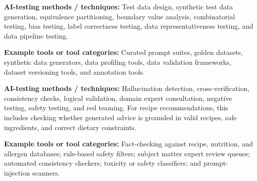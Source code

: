 \documentclass[
  letterpaper,
  DIV=11,
  numbers=noendperiod,
  oneside]{scrreprt}
\begin{document}
\begin{tcolorbox}[enhanced jigsaw, arc=.35mm, bottomrule=.15mm, bottomtitle=1mm, breakable, colback=white, colbacktitle=quarto-callout-tip-color!10!white, colframe=quarto-callout-tip-color-frame, coltitle=black, left=2mm, leftrule=.75mm, opacityback=0, opacitybacktitle=0.6, rightrule=.15mm, title=\textcolor{quarto-callout-tip-color}{\faLightbulb}\hspace{0.5em}{What test data do we use, and how is it managed?}, titlerule=0mm, toprule=.15mm, toptitle=1mm]

\textbf{AI-testing methods / techniques:} Test data design, synthetic
test data generation, equivalence partitioning, boundary value analysis,
combinatorial testing, bias testing, label correctness testing, data
representativeness testing, and data pipeline testing.

\textbf{Example tools or tool categories:} Curated prompt suites, golden
datasets, synthetic data generators, data profiling tools, data
validation frameworks, dataset versioning tools, and annotation tools.

\end{tcolorbox}

\begin{tcolorbox}[enhanced jigsaw, arc=.35mm, bottomrule=.15mm, bottomtitle=1mm, breakable, colback=white, colbacktitle=quarto-callout-tip-color!10!white, colframe=quarto-callout-tip-color-frame, coltitle=black, left=2mm, leftrule=.75mm, opacityback=0, opacitybacktitle=0.6, rightrule=.15mm, title=\textcolor{quarto-callout-tip-color}{\faLightbulb}\hspace{0.5em}{How do we test for hallucinations, unsafe advice, and misleading
confidence?}, titlerule=0mm, toprule=.15mm, toptitle=1mm]

\textbf{AI-testing methods / techniques:} Hallucination detection,
cross-verification, consistency checks, logical validation, domain
expert consultation, negative testing, safety testing, and red teaming.
For recipe recommendations, this includes checking whether generated
advice is grounded in valid recipes, safe ingredients, and correct
dietary constraints.

\textbf{Example tools or tool categories:} Fact-checking against recipe,
nutrition, and allergen databases; rule-based safety filters; subject
matter expert review queues; automated consistency checkers; toxicity or
safety classifiers; and prompt-injection scanners.

\end{tcolorbox}
\end{document}
